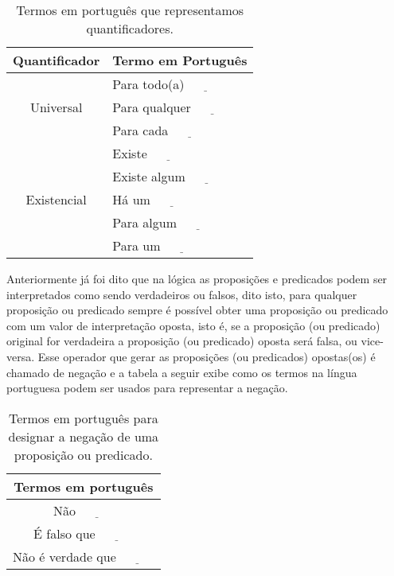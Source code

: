 \begin{table}[h]
	\centering
	\label{tab:QuantificadoresPT-BR}
	\begin{tabular}{cl}
		\hline
		\textbf{Quantificador}  & \textbf{Termo em Portugu\^es} \\ \hline
		\multirow{3}{*}{Universal}    & Para todo(a) $\underline{ \ \ \ \ \ \ \ \ \ \ \ \ }$\\
		& Para qualquer $\underline{ \ \ \ \ \ \ \ \ \ \ \ \ }$\\
		& Para cada $\underline{ \ \ \ \ \ \ \ \ \ \ \ \ }$\\ \hline
		\multirow{5}{*}{Existencial} & Existe $\underline{ \ \ \ \ \ \ \ \ \ \ \ \ }$\\
		& Existe algum $\underline{ \ \ \ \ \ \ \ \ \ \ \ \ }$\\
		& Há um $\underline{ \ \ \ \ \ \ \ \ \ \ \ \ }$\\
		& Para algum $\underline{ \ \ \ \ \ \ \ \ \ \ \ \ }$\\
		& Para um $\underline{ \ \ \ \ \ \ \ \ \ \ \ \ }$\\ \hline
	\end{tabular}
	\caption{Termos em português que representamos quantificadores.}
\end{table}

Anteriormente já foi dito que na lógica as proposições e predicados podem ser interpretados como sendo verdadeiros ou falsos, dito isto, para qualquer proposição ou predicado sempre é possível obter uma proposição ou predicado com um valor de interpretação oposta, isto é, se a proposição (ou predicado) original for verdadeira a proposição (ou predicado) oposta será falsa, ou vice-versa. Esse operador que gerar as proposições (ou predicados) opostas(os) é chamado de negação e a tabela a seguir exibe como os termos na língua portuguesa podem ser usados para representar a negação.

\begin{table}[h]
	\label{tab:NegacaoPortugues}
	\centering
	\begin{tabular}{c}
		\hline
		\textbf{Termos em português}\\
		\hline
		Não $\underline{ \ \ \ \ \ \ \ \ \ \ \ \ }$ \\
		É falso que $\underline{ \ \ \ \ \ \ \ \ \ \ \ \ }$\\
		Não é verdade que $\underline{ \ \ \ \ \ \ \ \ \ \ \ \ }$ \\ \hline
	\end{tabular}
	\caption{Termos em português para designar a negação de uma proposição ou predicado.}
\end{table}

